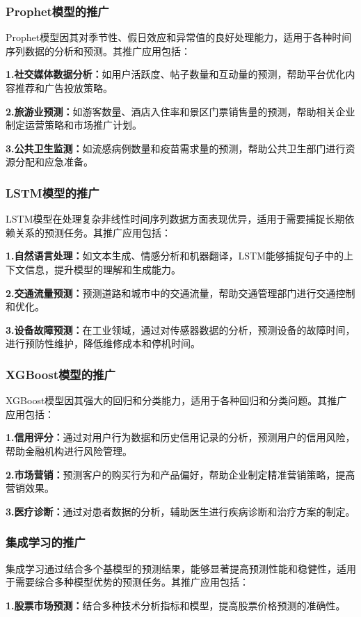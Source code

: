 \documentclass[a4paper]{article}
\begin{document}
	\subsubsection{Prophet模型的推广}
	Prophet模型因其对季节性、假日效应和异常值的良好处理能力，适用于各种时间序列数据的分析和预测。其推广应用包括：

	\textbf{1.社交媒体数据分析：}如用户活跃度、帖子数量和互动量的预测，帮助平台优化内容推荐和广告投放策略。
	
	\textbf{2.旅游业预测：}如游客数量、酒店入住率和景区门票销售量的预测，帮助相关企业制定运营策略和市场推广计划。
	
	\textbf{3.公共卫生监测：}如流感病例数量和疫苗需求量的预测，帮助公共卫生部门进行资源分配和应急准备。
	\subsubsection{LSTM模型的推广}
	LSTM模型在处理复杂非线性时间序列数据方面表现优异，适用于需要捕捉长期依赖关系的预测任务。其推广应用包括：

	\textbf{1.自然语言处理：}如文本生成、情感分析和机器翻译，LSTM能够捕捉句子中的上下文信息，提升模型的理解和生成能力。
	
	\textbf{2.交通流量预测：}预测道路和城市中的交通流量，帮助交通管理部门进行交通控制和优化。
	
	\textbf{3.设备故障预测：}在工业领域，通过对传感器数据的分析，预测设备的故障时间，进行预防性维护，降低维修成本和停机时间。
	\subsubsection{XGBoost模型的推广}
	XGBoost模型因其强大的回归和分类能力，适用于各种回归和分类问题。其推广应用包括：

	\textbf{1.信用评分：}通过对用户行为数据和历史信用记录的分析，预测用户的信用风险，帮助金融机构进行风险管理。
	
	\textbf{2.市场营销：}预测客户的购买行为和产品偏好，帮助企业制定精准营销策略，提高营销效果。
	
	\textbf{3.医疗诊断：}通过对患者数据的分析，辅助医生进行疾病诊断和治疗方案的制定。
	\subsubsection{集成学习的推广}
	集成学习通过结合多个基模型的预测结果，能够显著提高预测性能和稳健性，适用于需要综合多种模型优势的预测任务。其推广应用包括：

	\textbf{1.股票市场预测：}结合多种技术分析指标和模型，提高股票价格预测的准确性。
	
\end{document}
